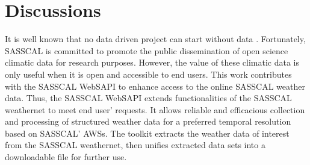 \documentclass[a4paper, 10pt, conference]{ieeeconf}      %
\begin{document}
\newpage
\section{Discussions}

\label{Discus}
\noindent
It is well known that no data driven project can start without data \cite{Abbott}. Fortunately, SASSCAL is committed to promote the public dissemination of open science climatic data for research purposes. However, the value of these climatic  data is only useful when it is open and accessible to end users. 
This work contributes with the SASSCAL WebSAPI to enhance access to the  online SASSCAL weather data.
Thus, the SASSCAL WebSAPI extends functionalities of the SASSCAL weathernet to meet end user' requests. It allows reliable and efficacious collection and processing of structured weather data for a preferred temporal resolution based on SASSCAL'  AWSs.  The toolkit extracts the weather data of interest from the SASSCAL weathernet, then unifies  extracted data sets into a downloadable file for further use.\\
\\
\end{document}
